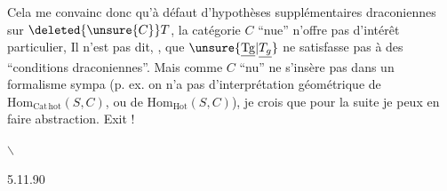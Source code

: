 Cela me convainc donc qu'à défaut
d'hypothèses supplémentaires draconiennes sur $\deleted{\unsure{C}}T$, la catégorie $C$ ``nue'' n'offre pas d'intérêt particulier,  Il n'est pas dit, , que $\unsure{\underline{\mathrm{Tg}}|\underline{T_g}}$ ne satisfasse pas à des ``conditions draconiennes''. Mais comme $C$ ``nu'' ne  s'insère pas dans un formalisme sympa (p. ex. on n'a pas d'interprétation géométrique de $\mathrm{Hom}_{\mathrm{Cat\,hot}}(S,C)$, ou de $\mathrm{Hom}_{\mathrm{Hot}}(S,C)$), je crois que pour la suite je peux en faire abstraction. Exit  !

\hfill$\backslash$\hfill\mbox{}

\hfill 5.11.90

